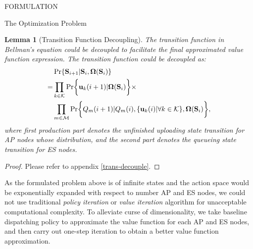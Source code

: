 \documentclass[10pt, conference, letterpaper]{IEEEtran}
\newtheorem{lemma}{Lemma}
\renewcommand{\vec}{\mathbf}
\DeclarePairedDelimiter{\set}{\{}{\}}
\DeclarePairedDelimiter{\Brace}{\bigg\{}{\bigg\}}
\newcommand{\apSet}{\mathcal{K}}
\newcommand{\esSet}{\mathcal{M}}
\newcommand{\Stat}{\mathbf{S}}
\newcommand{\Policy}{\mathbf{\Omega}}
\begin{document}
\begin{section}{FORMULATION}
\begin{subsection}{The Optimization Problem}
            \begin{lemma}[Transition Function Decoupling]
                The transition function in Bellman's equation could be decoupled to facilitate the final approximated value function expression. The transition function could be decoupled as:
                \begin{align}
                    & \Pr\{\Stat_{i+1}|\Stat_{i}, \Policy(\Stat_{i})\} 
                    \nonumber\\
                    =& \prod_{k\in\apSet} \Pr\Brace{\vec{u}_k(i+1)|\Policy(\Stat_{i})} \times
                        \nonumber\\
                        & \prod_{m\in\esSet}
                            \Pr \Brace{Q_m(i+1)|Q_m(i), \set{\vec{u}_k(i)|\forall k\in\apSet}, \Policy(\Stat_{i})},
                \end{align}
                where first production part denotes the unfinished uploading state transition for AP nodes whose distribution, and the second part denotes the queueing state transition for ES nodes.
            \end{lemma}
            \begin{proof}
                Please refer to appendix \ref{trans-decouple}.
            \end{proof}

            As the formulated problem above is of infinite states and the action space would be exponentially expanded with respect to number AP and ES nodes, we could not use traditional \emph{policy iteration} or \emph{value iteration} algorithm \cite{sutton1998introduction} for unacceptable computational complexity. To alleviate curse of dimensionality, we take baseline dispatching policy to approximate the value function for each AP and ES nodes, and then carry out one-step iteration to obtain a better value function approximation.
        \end{subsection}
    \end{section}
\end{document}
